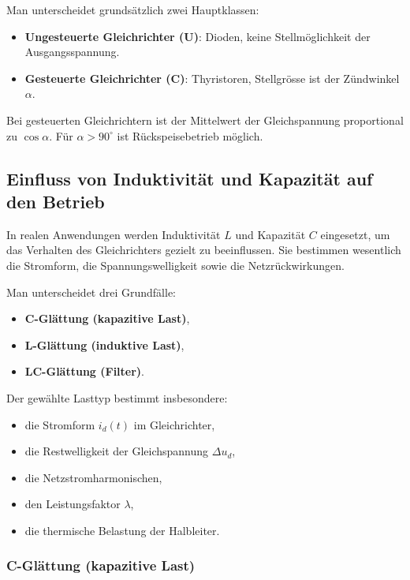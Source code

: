 Man unterscheidet grundsätzlich zwei Hauptklassen:

\begin{itemize}
\item \textbf{Ungesteuerte Gleichrichter (U)}:  
Dioden, keine Stellmöglichkeit der Ausgangsspannung.

\item \textbf{Gesteuerte Gleichrichter (C)}:  
Thyristoren, Stellgrösse ist der Zündwinkel $\alpha$.
\end{itemize}

Bei gesteuerten Gleichrichtern ist der Mittelwert der Gleichspannung
proportional zu $\cos\alpha$.
Für $\alpha > 90^\circ$ ist Rückspeisebetrieb möglich.

\subsection{Einfluss von Induktivität und Kapazität auf den Betrieb}

In realen Anwendungen werden Induktivität $L$ und Kapazität $C$ eingesetzt,
um das Verhalten des Gleichrichters gezielt zu beeinflussen.
Sie bestimmen wesentlich die Stromform, die Spannungswelligkeit
sowie die Netzrückwirkungen.

Man unterscheidet drei Grundfälle:

\begin{itemize}
\item \textbf{C-Glättung (kapazitive Last)},
\item \textbf{L-Glättung (induktive Last)},
\item \textbf{LC-Glättung (Filter)}.
\end{itemize}

Der gewählte Lasttyp bestimmt insbesondere:

\begin{itemize}
\item die Stromform $i_d(t)$ im Gleichrichter,
\item die Restwelligkeit der Gleichspannung $\Delta u_d$,
\item die Netzstromharmonischen,
\item den Leistungsfaktor $\lambda$,
\item die thermische Belastung der Halbleiter.
\end{itemize}

\subsubsection*{C-Glättung (kapazitive Last)}

